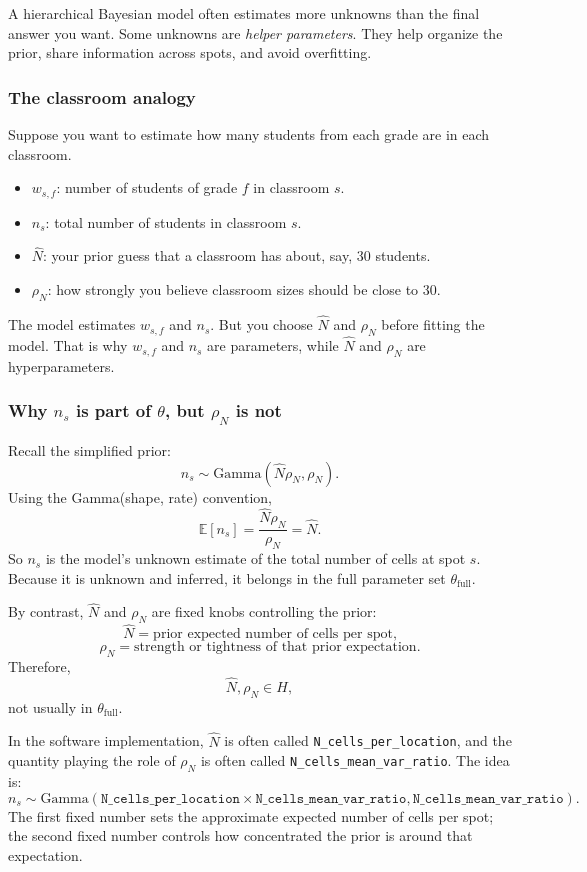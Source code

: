 \documentclass[11pt]{article}
\newcommand{\E}{\mathbb{E}}
\begin{document}
\begin{bigidea}
A hierarchical Bayesian model often estimates more unknowns than the final answer you want. Some unknowns are \emph{helper parameters}. They help organize the prior, share information across spots, and avoid overfitting.
\end{bigidea}

\subsubsection*{The classroom analogy}

Suppose you want to estimate how many students from each grade are in each classroom.

\begin{itemize}
  \item $w_{s,f}$: number of students of grade $f$ in classroom $s$.
  \item $n_s$: total number of students in classroom $s$.
  \item $\hat N$: your prior guess that a classroom has about, say, 30 students.
  \item $\rho_N$: how strongly you believe classroom sizes should be close to 30.
\end{itemize}

The model estimates $w_{s,f}$ and $n_s$. But you choose $\hat N$ and $\rho_N$ before fitting the model. That is why $w_{s,f}$ and $n_s$ are parameters, while $\hat N$ and $\rho_N$ are hyperparameters.

\subsubsection*{Why $n_s$ is part of $\theta$, but $\rho_N$ is not}

Recall the simplified prior:
\[
n_s\sim \mathrm{Gamma}(\hat N\rho_N,\rho_N).
\]
Using the Gamma(shape, rate) convention,
\[
\E[n_s]=\frac{\hat N\rho_N}{\rho_N}=\hat N.
\]
So $n_s$ is the model's unknown estimate of the total number of cells at spot $s$. Because it is unknown and inferred, it belongs in the full parameter set $\theta_{\mathrm{full}}$.

By contrast, $\hat N$ and $\rho_N$ are fixed knobs controlling the prior:
\[
\hat N=\text{prior expected number of cells per spot,}
\]
\[
\rho_N=\text{strength or tightness of that prior expectation.}
\]
Therefore,
\[
\hat N,\rho_N\in H,
\]
not usually in $\theta_{\mathrm{full}}$.

In the software implementation, $\hat N$ is often called \texttt{N\_cells\_per\_location}, and the quantity playing the role of $\rho_N$ is often called \texttt{N\_cells\_mean\_var\_ratio}. The idea is:
\[
n_s\sim
\mathrm{Gamma}
\left(
\texttt{N\_cells\_per\_location}\times
\texttt{N\_cells\_mean\_var\_ratio},
\texttt{N\_cells\_mean\_var\_ratio}
\right).
\]
The first fixed number sets the approximate expected number of cells per spot; the second fixed number controls how concentrated the prior is around that expectation.
\end{document}
